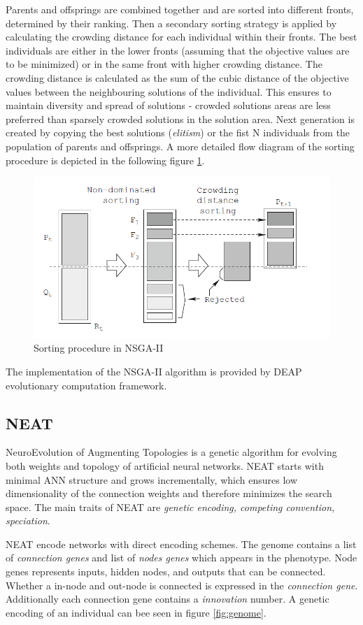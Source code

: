 \documentclass[format=acmsmall, review=false, screen=true]{acmart}
\begin{document}
Parents and offsprings are combined together and are sorted into different fronts, determined by their ranking. Then a secondary sorting strategy is applied by calculating the crowding distance for each individual within their fronts. The best individuals are either in the lower fronts (assuming that the objective values are to be minimized) or in the same front with higher crowding distance. The crowding distance is calculated as the sum of the cubic distance of the objective values between the neighbouring solutions of the individual. This ensures to maintain diversity and spread of solutions - crowded solutions areas are less preferred than sparsely crowded solutions in the solution area. Next generation is created by copying the best solutions (\emph{elitism}) or the fist N individuals from the population of parents and offsprings. A more detailed flow diagram of the sorting procedure is depicted in the following figure \ref{fig:nsga}.

\begin{figure}[H]
  \includegraphics[width=0.66\linewidth]{img/nsga.PNG}
  \caption{\label{fig:nsga}Sorting procedure in NSGA-II}
\end{figure}

The implementation of the NSGA-II algorithm is provided by DEAP\cite{fortin2012deap} evolutionary computation framework.

\subsection{NEAT}

NeuroEvolution of Augmenting Topologies \cite{stanley2002evolving} is a genetic algorithm for evolving both weights and topology of artificial neural networks. NEAT starts with minimal ANN structure and grows incrementally, which ensures low dimensionality of the connection weights and therefore minimizes the search space. The main traits of NEAT are \emph{genetic encoding, competing convention, speciation}.

NEAT encode networks with direct encoding schemes. The genome contains a list of \emph{connection genes} and list of \emph{nodes genes} which appears in the phenotype. Node genes represents inputs, hidden nodes, and outputs that can be connected. Whether a in-node and out-node is connected is expressed in the \emph{connection gene}. Additionally each connection gene contains a \emph{innovation} number. A genetic encoding of an individual can bee seen in figure \ref{fig:genome}.
\end{document}
